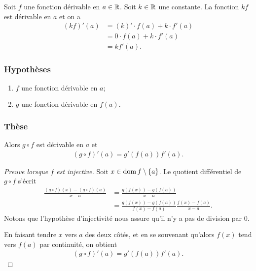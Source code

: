 \documentclass[main.tex]{subfiles}
\begin{document}
\begin{example}
    [Dérivée de $k f(x)$]
    Soit $f$ une fonction dérivable en $a \in \mathbb{R}$.
    Soit $k \in \mathbb{R}$ une constante. 
    La fonction $kf$ est dérivable en $a$ et on a 
    \begin{align}
        (kf)'(a) 
        &= (k)' \cdot f(a) + k \cdot f'(a)\\
        &= 0 \cdot f(a) + k \cdot f'(a)\\
        &= kf'(a).
    \end{align}
\end{example}

\begin{proposition}

    \subsubsection{Hypothèses}

    \begin{enumerate}
        \item $f$ une fonction dérivable en $a$;
        \item $g$ une fonction dérivable en $f(a)$.
    \end{enumerate}

    \subsubsection{Thèse}

    Alors $g \circ f$ est dérivable en $a$ et
    \begin{align}
        (g \circ f)'(a) = g'(f(a)) f'(a).
    \end{align}
\end{proposition}
\begin{proof}[Preuve lorsque $f$ est injective]
    Soit $x \in \operatorname{dom} f \setminus \{a\}$.
    Le quotient différentiel de $g \circ f$ s'écrit
    \begin{align}
        \frac {(g \circ f)(x) - (g \circ f)(a)} {x - a}
        &= \frac {g(f(x)) - g(f(a))} {x - a}\\
        &= \frac {g(f(x)) - g(f(a))} {f(x) - f(a)} \frac {f(x) - f(a)} {x - a}.
    \end{align}
    Notons que l'hypothèse d'injectivité nous assure qu'il n'y a pas de division par $0$.

    En faisant tendre $x$ vers $a$ des deux côtés,
    et en se souvenant qu'alors $f(x)$ tend vers $f(a)$ par continuité,
    on obtient
    \begin{align}
        (g \circ f)'(a) = g'(f(a)) f'(a).
    \end{align}
\end{proof}
\end{document}
